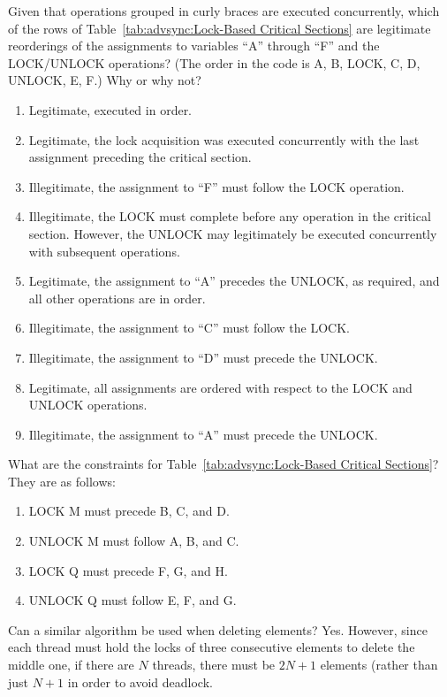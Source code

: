 \QuickQ{}
	Given that operations grouped in curly braces are executed
	concurrently, which of the rows of
	Table~\ref{tab:advsync:Lock-Based Critical Sections}
	are legitimate reorderings of the assignments to variables
	``A'' through ``F'' and the LOCK/UNLOCK operations?
	(The order in the code is A, B, LOCK, C, D, UNLOCK, E, F.)
	Why or why not?
\QuickA{}
	\begin{enumerate}
	\item	Legitimate, executed in order.
	\item	Legitimate, the lock acquisition was executed concurrently
		with the last assignment preceding the critical section.
	\item	Illegitimate, the assignment to ``F'' must follow the LOCK
		operation.
	\item	Illegitimate, the LOCK must complete before any operation in
		the critical section.  However, the UNLOCK may legitimately
		be executed concurrently with subsequent operations.
	\item	Legitimate, the assignment to ``A'' precedes the UNLOCK,
		as required, and all other operations are in order.
	\item	Illegitimate, the assignment to ``C'' must follow the LOCK.
	\item	Illegitimate, the assignment to ``D'' must precede the UNLOCK.
	\item	Legitimate, all assignments are ordered with respect to the
		LOCK and UNLOCK operations.
	\item	Illegitimate, the assignment to ``A'' must precede the UNLOCK.
	\end{enumerate}

\QuickQ{}
	What are the constraints for
	Table~\ref{tab:advsync:Lock-Based Critical Sections}?
\QuickA{}
	They are as follows:
	\begin{enumerate}
	\item	LOCK M must precede B, C, and D.
	\item	UNLOCK M must follow A, B, and C.
	\item	LOCK Q must precede F, G, and H.
	\item	UNLOCK Q must follow E, F, and G.
	\end{enumerate}

\QuickQ{}
	Can a similar algorithm be used when deleting elements?
\QuickA{}
	Yes.
	However, since each thread must hold the locks of three
	consecutive elements to delete the middle one, if there
	are $N$ threads, there must be $2N+1$ elements (rather than
	just $N+1$ in order to avoid deadlock.

